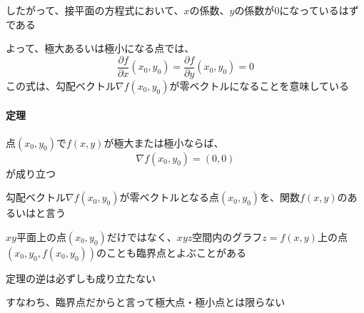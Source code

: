 \documentclass[../book_jiriki_calc]{subfiles}
\begin{document}
したがって、接平面の方程式において、$x$の係数、$y$の係数が$0$になっているはずである

\br

よって、極大あるいは極小になる点では、
\begin{equation*}
  \dfrac{\partial f}{\partial x}(x_0, y_0) = \dfrac{\partial f}{\partial y}(x_0, y_0) = 0
\end{equation*}
この式は、勾配ベクトル$\nabla f(x_0, y_0)$が零ベクトルになることを意味している

\sectionline

\paragraph{定理}

点$(x_0, y_0)$で$f(x, y)$が極大または極小ならば、
\begin{equation*}
  \nabla f(x_0, y_0) = (0,0)
\end{equation*}
が成り立つ

\sectionline

勾配ベクトル$\nabla f(x_0, y_0)$が零ベクトルとなる点$(x_0, y_0)$を、関数$f(x, y)$のあるいはと言う

$xy$平面上の点$(x_0, y_0)$だけではなく、$xyz$空間内のグラフ$z=f(x, y)$上の点$(x_0, y_0, f(x_0, y_0))$のことも臨界点とよぶことがある

\br

定理の逆は必ずしも成り立たない

すなわち、臨界点だからと言って極大点・極小点とは限らない
\end{document}

